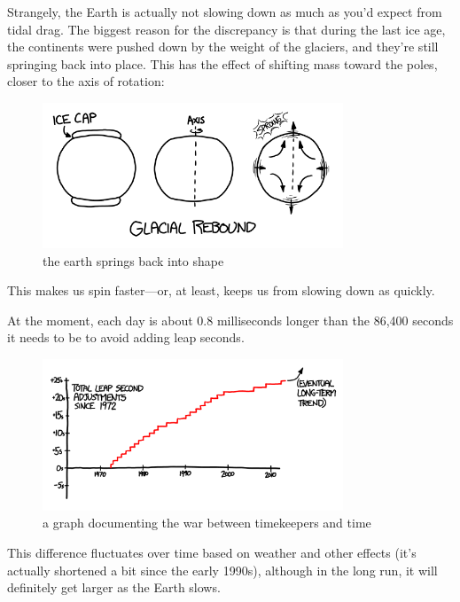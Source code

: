 {Strangely, the Earth is actually not slowing down as much as you’d expect from tidal drag. The biggest reason for the discrepancy is that during the last ice age, the continents were pushed down by the weight of the glaciers, and they’re still springing back into place. This has the effect of shifting mass toward the poles, closer to the axis of rotation:}

\begin{figure}[!htbp]
\centering
\includegraphics[scale=0.5, max width=0.8\textwidth]{imgs/a/26/leap_mass_shift.png}
\caption{the earth springs back into shape}
\end{figure}

{This makes us spin faster—or, at least, keeps us from slowing down as quickly.}

{At the moment, each day is about 0.8 milliseconds longer than the 86,400 seconds it needs to be to avoid adding leap seconds.}

\begin{figure}[!htbp]
\centering
\includegraphics[scale=0.5, max width=0.8\textwidth]{imgs/a/26/leap_graph.png}
\caption{a graph documenting the war between timekeepers and time}
\end{figure}

{This difference fluctuates over time based on weather and other effects (it’s actually shortened a bit since the early 1990s), although in the long run, it will definitely get larger as the Earth slows.}


